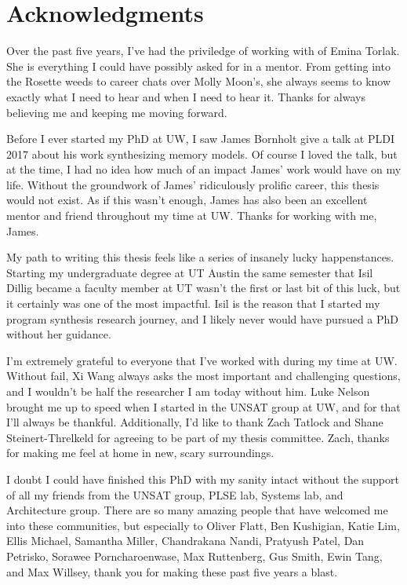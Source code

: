 \documentclass[12pt]{book}
\begin{document}
\begin{spacing}{1.5}
  \tableofcontents
\end{spacing}

\chapter*{Acknowledgments}

Over the past five years, I've had the priviledge of working with
of Emina Torlak. She is everything I could have possibly asked for
in a mentor. From getting into the Rosette weeds to career chats over Molly Moon's,
she always seems to know exactly what I need to hear and when I need to hear it.
Thanks for always believing me and keeping me moving forward.

Before I ever started my PhD at UW, I saw James Bornholt give a talk at PLDI 2017
about his work synthesizing memory models. Of course I loved the talk,
but at the time, I had no idea how much of an impact James' work would
have on my life. Without the groundwork of James' ridiculously prolific
career, this thesis would not exist. As if this wasn't enough, James has
also been an excellent mentor and friend throughout my time at UW. 
Thanks for working with me, James.

My path to writing this thesis feels like a series of insanely lucky
happenstances. Starting my undergraduate degree at UT Austin
the same semester that Isil Dillig became a faculty member at UT wasn't the
first or last bit of this luck, but it certainly was one of the most impactful.
Isil is the reason that I started my program synthesis research journey, and I
likely never would have pursued a PhD without her guidance.

I'm extremely grateful to everyone that I've worked with during my time at UW.
Without fail, Xi Wang always asks the most important and challenging questions,
and I wouldn't be half the researcher I am today without him.
Luke Nelson brought me up to speed when I started in the UNSAT group at UW,
and for that I'll always be thankful.
Additionally, I'd like to thank Zach Tatlock and Shane Steinert-Threlkeld
for agreeing to be part of my thesis committee.
Zach, thanks for making me feel at home in new, scary surroundings.

I doubt I could have finished this PhD with my sanity intact without the support
of all my friends from the UNSAT group, PLSE lab, Systems lab, and Architecture
group. There are so many amazing people that have welcomed me into these communities,
but especially to
Oliver Flatt,
Ben Kushigian,
Katie Lim,
Ellis Michael,
Samantha Miller,
Chandrakana Nandi,
Pratyush Patel,
Dan Petrisko,
Sorawee Porncharoenwase,
Max Ruttenberg,
Gus Smith,
Ewin Tang,
and Max Willsey,
thank you for making these past five years a blast.
\end{document}
